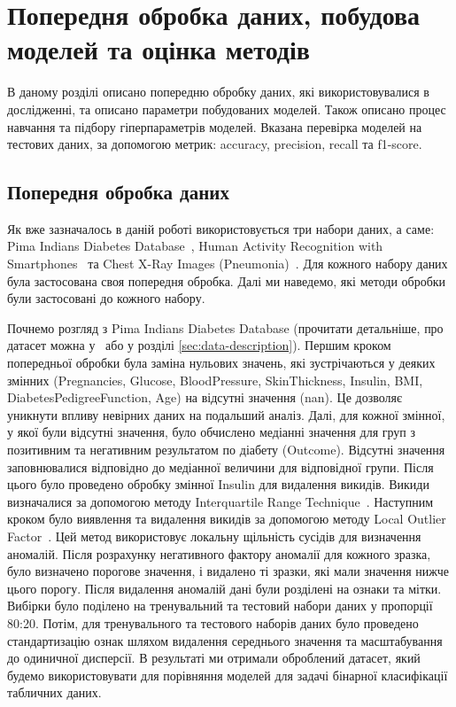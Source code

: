 \chapter{Попередня обробка даних, побудова моделей та оцінка методів}
\label{chap:practice}

В даному розділі описано попередню обробку даних, які використовувалися в дослідженні, та описано параметри побудованих моделей. Також описано процес навчання та підбору гіперпараметрів моделей. Вказана перевірка моделей на тестових даних, за допомогою метрик: accuracy, precision, recall та f1-score.

\section{Попередня обробка даних}

Як вже зазначалось в даній роботі використовується три набори даних, а саме: Pima Indians Diabetes Database~\cite{ct30}, Human Activity Recognition with Smartphones~\cite{ct31} та Chest X-Ray Images (Pneumonia)~\cite{ct32}. Для кожного набору даних була застосована своя попередня обробка. Далі ми наведемо, які методи обробки були застосовані до кожного набору.

Почнемо розгляд з Pima Indians Diabetes Database (прочитати детальніше, про датасет можна у~\cite{ct30} або у розділі \ref{sec:data-description}). Першим кроком попередньої обробки була заміна нульових значень, які зустрічаються у деяких змінних (Pregnancies, Glucose, BloodPressure, SkinThickness, Insulin, BMI, DiabetesPedigreeFunction, Age) на відсутні значення (nan). Це дозволяє уникнути впливу невірних даних на подальший аналіз. Далі, для кожної змінної, у якої були відсутні значення, було обчислено медіанні значення для груп з позитивним та негативним результатом по діабету (Outcome). Відсутні значення заповнювалися відповідно до медіанної величини для відповідної групи. Після цього було проведено обробку змінної Insulin для видалення викидів. Викиди визначалися за допомогою методу Interquartile Range Technique~\cite{ct33}. Наступним кроком було виявлення та видалення викидів за допомогою методу Local Outlier Factor~\cite{ct34}. Цей метод використовує локальну щільність сусідів для визначення аномалій. Після розрахунку негативного фактору аномалії для кожного зразка, було визначено порогове значення, і видалено ті зразки, які мали значення нижче цього порогу. Після видалення аномалій дані були розділені на ознаки та мітки. Вибірки було поділено на тренувальний та тестовий набори даних у пропорції 80:20. Потім, для тренувального та тестового наборів даних було проведено стандартизацію ознак шляхом видалення середнього значення та масштабування до одиничної дисперсії. В результаті ми отримали оброблений датасет, який будемо використовувати для порівняння моделей для задачі бінарної класифікації табличних даних.

